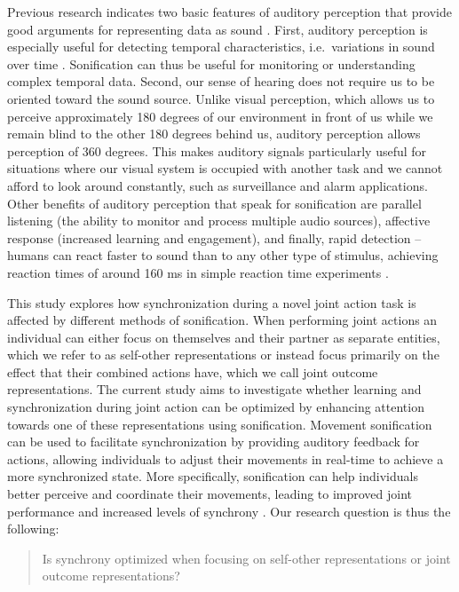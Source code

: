 \documentclass[10pt,a4paper,onecolumn]{article}
\begin{document}
Previous research indicates two basic features of auditory perception that provide good arguments for representing data as sound \autocite{kramerSonificationReportStatus1999}. First, auditory perception is especially useful for detecting temporal characteristics, i.e.~variations in sound over time \autocite{hildebrandtShortPaperEnhancing2014}. Sonification can thus be useful for monitoring or understanding complex temporal data. Second, our sense of hearing does not require us to be oriented toward the sound source. Unlike visual perception, which allows us to perceive approximately 180 degrees of our environment in front of us while we remain blind to the other 180 degrees behind us, auditory perception allows perception of 360 degrees. This makes auditory signals particularly useful for situations where our visual system is occupied with another task and we cannot afford to look around constantly, such as surveillance and alarm applications. Other benefits of auditory perception that speak for sonification are parallel listening (the ability to monitor and process multiple audio sources), affective response (increased learning and engagement), and finally, rapid detection -- humans can react faster to sound than to any other type of stimulus, achieving reaction times of around 160 ms in simple reaction time experiments \autocite{kosinskiLiteratureReviewReaction2008,kramerSonificationReportStatus1999}.

This study explores how synchronization during a novel joint action task is affected by different methods of sonification. When performing joint actions an individual can either focus on themselves and their partner as separate entities, which we refer to as self-other representations or instead focus primarily on the effect that their combined actions have, which we call joint outcome representations. The current study aims to investigate whether learning and synchronization during joint action can be optimized by enhancing attention towards one of these representations using sonification. Movement sonification can be used to facilitate synchronization by providing auditory feedback for actions, allowing individuals to adjust their movements in real-time to achieve a more synchronized state. More specifically, sonification can help individuals better perceive and coordinate their movements, leading to improved joint performance and increased levels of synchrony \autocite{dotovEntrainingChaoticDynamics2018}. Our research question is thus the following:

\begin{quote}
Is synchrony optimized when focusing on self-other representations or joint outcome representations?
\end{quote}
\end{document}
